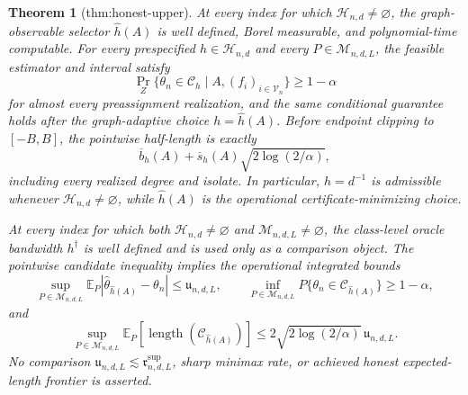 \documentclass{article}
\newtheorem{theorem}{Theorem}
\begin{document}
\begin{theorem}[thm:honest-upper]\label{thm:honest-upper}
At every index for which \(\mathcal H_{n,d}\ne\varnothing\), the graph-observable selector \(\widehat h(A)\) is well defined, Borel measurable, and polynomial-time computable.  For every prespecified \(h\in\mathcal H_{n,d}\) and every \(P\in\mathcal M_{n,d,L}\), the feasible estimator and interval satisfy
\[
 \Pr_Z\{\theta_n\in\mathcal C_h\mid A,(f_i)_{i\in\mathcal V_n}\}\geq1-\alpha
\]
for almost every preassignment realization, and the same conditional guarantee holds after the graph-adaptive choice \(h=\widehat h(A)\).  Before endpoint clipping to \([-B,B]\), the pointwise half-length is exactly
\[
 \overline b_h(A)+\overline s_h(A)\sqrt{2\log(2/\alpha)},
\]
including every realized degree and isolate.  In particular, \(h=d^{-1}\) is admissible whenever \(\mathcal H_{n,d}\ne\varnothing\), while \(\widehat h(A)\) is the operational certificate-minimizing choice.

At every index for which both \(\mathcal H_{n,d}\ne\varnothing\) and \(\mathcal M_{n,d,L}\ne\varnothing\), the class-level oracle bandwidth \(h^\dagger\) is well defined and is used only as a comparison object.  The pointwise candidate inequality implies the operational integrated bounds
\[
 \sup_{P\in\mathcal M_{n,d,L}}
 \mathbb E_P|\widehat\theta_{\widehat h(A)}-\theta_n|
 \leq\mathfrak u_{n,d,L},
 \qquad
 \inf_{P\in\mathcal M_{n,d,L}}
 P\{\theta_n\in\mathcal C_{\widehat h(A)}\}\geq1-\alpha,
\]
and
\[
 \sup_{P\in\mathcal M_{n,d,L}}
 \mathbb E_P[\operatorname{length}(\mathcal C_{\widehat h(A)})]
 \leq2\sqrt{2\log(2/\alpha)}\,\mathfrak u_{n,d,L}.
\]
No comparison \(\mathfrak u_{n,d,L}\lesssim\mathfrak r^{\mathrm{sup}}_{n,d,L}\), sharp minimax rate, or achieved honest expected-length frontier is asserted.
\end{theorem}
\end{document}
